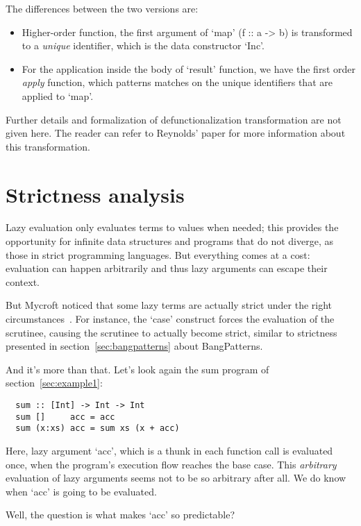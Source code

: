 \documentclass[diploma]{softlab-thesis}
\begin{document}
The differences between the two versions are:
\begin{itemize}
  \item Higher-order function, the first argument of `map' (f :: a -> b) is 
  transformed to a \textit{unique} identifier, which is the data constructor `Inc'.
  \item For the application inside the body of `result' function, we have the first order \textit{apply}
  function, which patterns matches on the unique identifiers that are applied to `map'.
\end{itemize}

Further details and formalization of defunctionalization transformation are not given here. 
The reader can refer to Reynolds' paper for more information about this transformation.

\section {Strictness analysis}
\label{sec:strictness-analysis}

Lazy evaluation only evaluates terms to values when needed; this provides the 
opportunity for infinite data structures and programs that do not diverge, as those in 
strict programming languages. But everything comes at a cost: evaluation can happen 
arbitrarily and thus lazy arguments can escape their context.

But Mycroft
noticed that some lazy terms are actually strict under the right circumstances~\cite{Mycroft:1980:TPT:647324.721526}. For instance, the `case' 
construct forces the evaluation of the scrutinee, causing the scrutinee to actually become strict, 
similar to strictness presented in section~\ref{sec:bangpatterns} about BangPatterns. 

And it's more than that. Let's look again the sum program of section~\ref{sec:example1}:
\begin{verbatim}
  sum :: [Int] -> Int -> Int
  sum []     acc = acc
  sum (x:xs) acc = sum xs (x + acc)
\end{verbatim}

Here, lazy argument `acc', which is a thunk in each function call is evaluated once, when the program's 
execution flow reaches the base case. This \textit{arbitrary} evaluation of lazy arguments seems not to 
be so arbitrary after all. We do know when `acc' is going to be evaluated.
\newline
\par Well, the question is what makes `acc' so predictable? 
\end{document}
